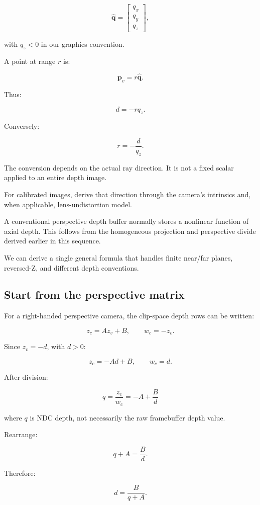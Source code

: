 \[ \hat{\mathbf q}= \begin{bmatrix}q_x\\q_y\\q_z\end{bmatrix}, \]

with \(q_z<0\) in our graphics convention.

A point at range \(r\) is:

\[ \mathbf p_v=r\hat{\mathbf q}. \]

Thus:

\[ \boxed{d=-rq_z}. \]

Conversely:

\[ \boxed{r=-\frac d{q_z}}. \]

The conversion depends on the actual ray direction. It is not a fixed scalar applied to an entire depth image.

For calibrated images, derive that direction through the camera's intrinsics and, when applicable, lens-undistortion model.

A conventional perspective depth buffer normally stores a nonlinear function of axial depth. This follows from the homogeneous projection and perspective divide derived earlier in this sequence.

We can derive a single general formula that handles finite near/far planes, reversed-Z, and different depth conventions.

\subsection{Start from the perspective matrix}\label{02-foundations-ii-ch035-start-from-the-perspective-matrix}

For a right-handed perspective camera, the clip-space depth rows can be written:

\[ z_c=Az_v+B, \qquad w_c=-z_v. \]

Since \(z_v=-d\), with \(d>0\):

\[ z_c=-Ad+B, \qquad w_c=d. \]

After division:

\[ \boxed{ q=\frac{z_c}{w_c}=-A+\frac Bd } \]

where \(q\) is NDC depth, not necessarily the raw framebuffer depth value.

Rearrange:

\[ q+A=\frac Bd. \]

Therefore:

\[ \boxed{ d=\frac B{q+A}. } \]

